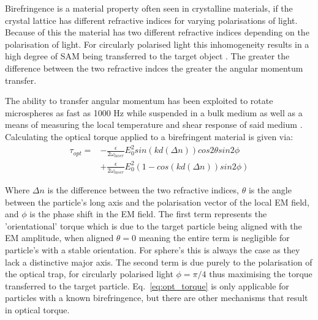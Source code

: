 Birefringence is a material property often seen in crystalline materials, 
if the crystal lattice has different refractive indices for varying 
polarisations of light. Because of this the material has two different 
refractive indices depending on the polarisation of light. For circularly 
polarised light this inhomogeneity results in a high degree of SAM being 
transferred to the target object \cite{Parkin2009, Arita2016}. The greater 
the difference between the two refractive indces the greater the angular
momentum transfer.

The ability to transfer angular momentum has been exploited to rotate 
microspheres as fast as 1000 Hz while suspended in a bulk medium 
\cite{Arita2016} as well as a means of measuring the local temperature 
and shear response of said medium \cite{Millen2014, RodriguezSevilla2018}. 
Calculating the optical torque applied to a birefringent material is given via:
\begin{equation}
	\label{eq:opt_torque}
	\begin{aligned}
		\tau_{opt} =& -\frac{\epsilon}{2\omega_{laser}}E_0^2sin(kd(\Delta n))cos2\theta sin2\phi 
		\\ &+  \frac{\epsilon}{2\omega_{laser}}E_0^2 (1-cos(kd(\Delta n))sin2\phi)
	\end{aligned}
\end{equation}

Where $\Delta n$ is the difference between the two refractive indices, 
$\theta$ is the angle between the particle's long axis and the polarisation 
vector of the local EM field, and $\phi$ is the phase shift in the EM 
field. The first term represents the 'orientational' torque which is 
due to the target particle being aligned with the EM amplitude, when 
aligned $\theta=0$ meaning the entire term is negligible for particle's 
with a stable orientation. For sphere's this is always the case as they 
lack a distinctive major axis. The second term is due purely to the 
polarisation of the optical trap, for circularly polarised light 
$\phi=\pi/4$ thus maximising the torque transferred to the target particle. 
Eq.~\eqref{eq:opt_torque} is only applicable for particles with a known
birefringence, but there are other mechanisms that result in optical torque.

